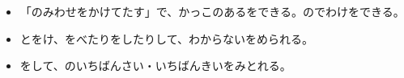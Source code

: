 \newcommand\bkthristep[2]{\par\addvspace{6pt}\Needspace{4\baselineskip}\noindent
  {\bkcircled[bkOrange]{#1}\enspace\sffamily\bfseries\color{bkOrange!75!black}#2}\par\nobreak\vspace{2pt}}
\newcommand\bkthrihead[1]{\par\addvspace{4pt}\Needspace{3\baselineskip}\noindent{\sffamily\bfseries #1}\par\nobreak\noindent}
\newcommand\bkthriwaku[1]{\par\addvspace{4pt}{\centering\setlength\fboxsep{4pt}\fcolorbox{bkOrange}{white}{#1}\par}\addvspace{4pt}}
\makeatother


\begin{goal}
\begin{itemize}[label={\color{\bkTT}●}, leftmargin=1.6\zw, itemsep=0pt, topsep=1pt]
\item {}\enspace 「のみわせをかけてたす」で、かっこのあるをできる。のでわけをできる。
\item {}\enspace {}とをけ、をべたりをしたりして、わからないをめられる。
\item {}\enspace {}をして、のいちばんさい・いちばんきいをみとれる。
\end{itemize}
\end{goal}

